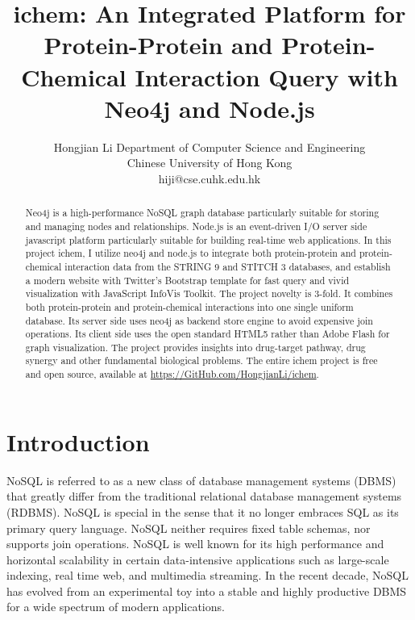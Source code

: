 \documentclass[10pt,conference,compsocconf]{IEEEtran}
\begin{document}
\title{ichem: An Integrated Platform for Protein-Protein and Protein-Chemical Interaction Query with Neo4j and Node.js}
\author
{
\IEEEauthorblockN
{
Hongjian Li
\IEEEauthorblockA
{
Department of Computer Science and Engineering\\
Chinese University of Hong Kong\\
hiji@cse.cuhk.edu.hk
}
}
}
\maketitle

\begin{abstract}

Neo4j is a high-performance NoSQL graph database particularly suitable for storing and managing nodes and relationships. Node.js is an event-driven I/O server side javascript platform particularly suitable for building real-time web applications. In this project ichem, I utilize neo4j and node.js to integrate both protein-protein and protein-chemical interaction data from the STRING 9 and STITCH 3 databases, and establish a modern website with Twitter's Bootstrap template for fast query and vivid visualization with JavaScript InfoVis Toolkit. The project novelty is 3-fold. It combines both protein-protein and protein-chemical interactions into one single uniform database. Its server side uses neo4j as backend store engine to avoid expensive join operations. Its client side uses the open standard HTML5 rather than Adobe Flash for graph visualization. The project provides insights into drug-target pathway, drug synergy and other fundamental biological problems. The entire ichem project is free and open source, available at \url{https://GitHub.com/HongjianLi/ichem}.

\end{abstract}

\section{Introduction}

NoSQL is referred to as a new class of database management systems (DBMS) that greatly differ from the traditional relational database management systems (RDBMS). NoSQL is special in the sense that it no longer embraces SQL as its primary query language. NoSQL neither requires fixed table schemas, nor supports join operations. NoSQL is well known for its high performance and horizontal scalability in certain data-intensive applications such as large-scale indexing, real time web, and multimedia streaming. In the recent decade, NoSQL has evolved from an experimental toy into a stable and highly productive DBMS for a wide spectrum of modern applications.
\end{document}
